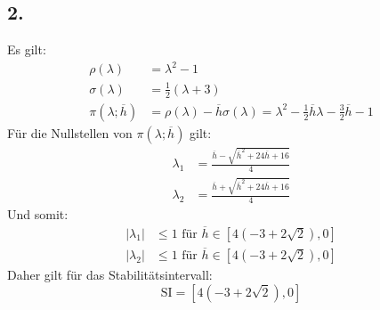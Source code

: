 \documentclass[10pt,oneside,a4paper]{scrartcl}
\begin{document}
    \subsection*{2.}
    Es gilt:
    \begin{align*}
        \rho(\lambda) &= \lambda^2 - 1 \\
        \sigma(\lambda) &= \frac{1}{2}(\lambda + 3) \\
        \pi(\lambda; \overline{h}) &= \rho(\lambda) -
        \overline{h}\sigma(\lambda) = \lambda^2 - \frac{1}{2}\overline{h}\lambda
        - \frac{3}{2}\overline{h} - 1
    \end{align*}
    Für die Nullstellen von $\pi(\lambda; \overline{h})$ gilt:
    \begin{align*}
        \lambda_1 & = \frac{\overline{h} - \sqrt{\overline{h}^2 +
        24\overline{h} + 16}}{4} \\
        \lambda_2 & = \frac{\overline{h} + \sqrt{\overline{h}^2 +
        24\overline{h} + 16}}{4}
    \end{align*}
    Und somit:
        \begin{align*}
        |\lambda_1| &\leq 1 \text{ für } \overline{h} \in [4(-3 + 2 \sqrt{2}),
        0]
        \\
        |\lambda_2| &\leq 1 \text{ für } \overline{h} \in [4(-3 + 2 \sqrt{2}),
        0]
    \end{align*}
    Daher gilt für das Stabilitätsintervall:
    \begin{equation*}
        \text{SI} = [4(-3 + 2 \sqrt{2}), 0]
    \end{equation*}
\end{document}
